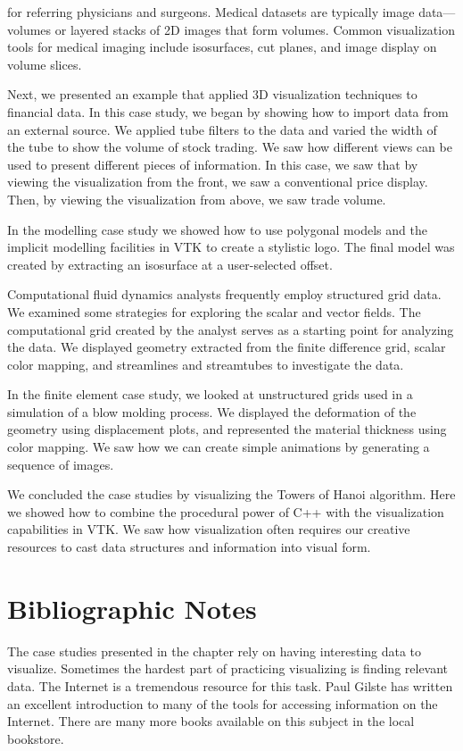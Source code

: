 for referring physicians and surgeons. Medical datasets are typically
image data---volumes or layered stacks of 2D images that form volumes. Common visualization tools for medical imaging include isosurfaces, cut planes, and image display on volume slices.

Next, we presented an example that applied 3D visualization techniques to financial data. In this case study, we began by showing how to import data from an external source. We applied tube filters to the data and varied the width of the tube to show the volume of stock trading. We saw how different views can be used to present different pieces of information. In this case, we saw that by viewing the visualization from the front, we saw a conventional price display. Then, by viewing the visualization from above, we saw trade volume.

In the modelling case study we showed how to use polygonal models and the implicit modelling facilities in VTK to create a stylistic logo. The final model was created by extracting an isosurface at a user-selected offset.

Computational fluid dynamics analysts frequently employ structured grid data. We examined some strategies for exploring the scalar and vector fields. The computational grid created by the analyst serves as a starting point for analyzing the data. We displayed geometry extracted from the finite difference grid, scalar color mapping, and streamlines and streamtubes to investigate the data.

In the finite element case study, we looked at unstructured grids used in a simulation of a blow molding process. We displayed the deformation of the geometry using displacement plots, and represented the material thickness using color mapping. We saw how we can create simple animations by generating a sequence of images.

We concluded the case studies by visualizing the Towers of Hanoi algorithm. Here we showed how to combine the procedural power of C++ with the visualization capabilities in VTK. We saw how visualization often requires our creative resources to cast data structures and information into visual form.


\section{Bibliographic Notes}

The case studies presented in the chapter rely on having interesting data to visualize. Sometimes the hardest part of practicing visualizing is finding relevant data. The Internet is a tremendous resource for this task. Paul Gilste \cite{Gilster94} has written an excellent introduction to many of the tools for accessing information on the Internet. There are many more books available on this subject in the local bookstore.

